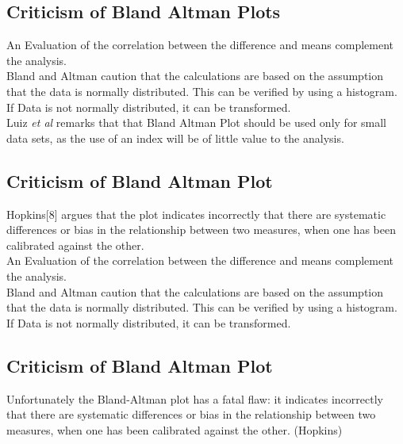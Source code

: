 \subsection{Criticism of Bland Altman Plots}

An Evaluation of the correlation between the difference and means
complement the analysis.
\\
Bland and Altman caution that the calculations are based on the
assumption that the data is normally distributed. This can be
verified by using a histogram. If Data is not normally
distributed, it can be transformed.
\\
Luiz \emph{et al} remarks that that Bland Altman Plot should be
used only for small data sets, as the use of an index will be of
little value to the analysis.


\subsection{Criticism of Bland Altman Plot}
Hopkins[$8$] argues that the plot indicates incorrectly that there
are systematic differences or bias in the relationship between two
measures, when one has been calibrated against the other.
\\
An Evaluation of the correlation between the difference and means
complement the analysis.
\\
Bland and Altman caution that the calculations are based on the
assumption that the data is normally distributed. This can be
verified by using a histogram. If Data is not normally
distributed, it can be transformed.


\subsection{Criticism of Bland Altman Plot}
Unfortunately the Bland-Altman plot has a fatal flaw: it indicates
incorrectly that there are systematic differences or bias in the
relationship between two measures, when one has been calibrated
against the other. (Hopkins)